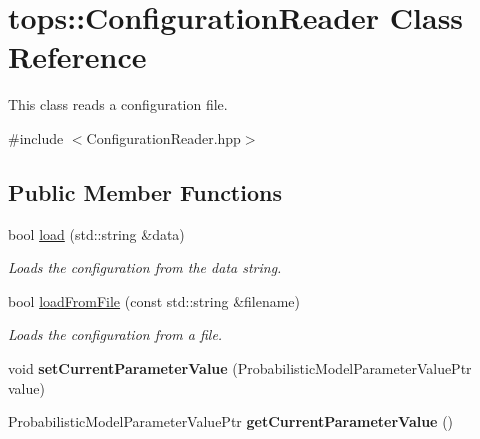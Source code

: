 \hypertarget{classtops_1_1ConfigurationReader}{}\section{tops\+:\+:Configuration\+Reader Class Reference}
\label{classtops_1_1ConfigurationReader}


This class reads a configuration file.  




{\ttfamily \#include $<$Configuration\+Reader.\+hpp$>$}

\subsection*{Public Member Functions}
\begin{DoxyCompactItemize}
\item 
\mbox{\label{classtops_1_1ConfigurationReader_a148538236b5a821dfcc44feef99a5dc1}} 
bool \hyperlink{classtops_1_1ConfigurationReader_a148538236b5a821dfcc44feef99a5dc1}{load} (std\+::string \&data)
\begin{DoxyCompactList}\small\item\em Loads the configuration from the data string. \end{DoxyCompactList}\item 
\mbox{\label{classtops_1_1ConfigurationReader_a830b793b186f7e9fe17bc00eff16e7f1}} 
bool \hyperlink{classtops_1_1ConfigurationReader_a830b793b186f7e9fe17bc00eff16e7f1}{load\+From\+File} (const std\+::string \&filename)
\begin{DoxyCompactList}\small\item\em Loads the configuration from a file. \end{DoxyCompactList}\item 
\mbox{\label{classtops_1_1ConfigurationReader_a83e683d2e79cf6de5c4e7c617302c786}} 
void {\bfseries set\+Current\+Parameter\+Value} (Probabilistic\+Model\+Parameter\+Value\+Ptr value)
\item 
\mbox{\label{classtops_1_1ConfigurationReader_ab12d621df5a3caf48f5e1981a2d2d23c}} 
Probabilistic\+Model\+Parameter\+Value\+Ptr {\bfseries get\+Current\+Parameter\+Value} ()

\end{DoxyCompactItemize}

